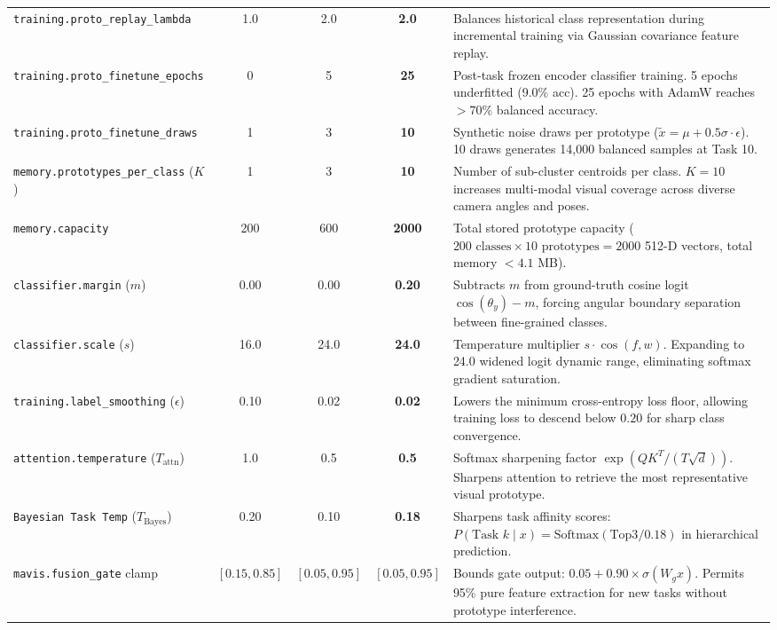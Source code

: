 \documentclass[11pt,a4paper]{article}
\begin{document}
\begin{table}[h!]
\begin{tabularx}{\textwidth}{p{3.2cm} c c c p{6.8cm}}
\texttt{training.proto\_replay\_lambda} & 1.0 & 2.0 & \textbf{2.0} & Balances historical class representation during incremental training via Gaussian covariance feature replay. \\
\texttt{training.proto\_finetune\_epochs} & 0 & 5 & \textbf{25} & Post-task frozen encoder classifier training. 5 epochs underfitted (9.0\% acc). 25 epochs with AdamW reaches $>70\%$ balanced accuracy. \\
\texttt{training.proto\_finetune\_draws} & 1 & 3 & \textbf{10} & Synthetic noise draws per prototype ($\tilde{x} = \mu + 0.5\sigma \cdot \epsilon$). 10 draws generates 14,000 balanced samples at Task 10. \\
\texttt{memory.prototypes\_per\_class} ($K$) & 1 & 3 & \textbf{10} & Number of sub-cluster centroids per class. $K=10$ increases multi-modal visual coverage across diverse camera angles and poses. \\
\texttt{memory.capacity} & 200 & 600 & \textbf{2000} & Total stored prototype capacity ($200 \text{ classes} \times 10 \text{ prototypes} = 2000$ 512-D vectors, total memory $<4.1$ MB). \\
\texttt{classifier.margin} ($m$) & 0.00 & 0.00 & \textbf{0.20} & Subtracts $m$ from ground-truth cosine logit $\cos(\theta_y) - m$, forcing angular boundary separation between fine-grained classes. \\
\texttt{classifier.scale} ($s$) & 16.0 & 24.0 & \textbf{24.0} & Temperature multiplier $s \cdot \cos(f, w)$. Expanding to 24.0 widened logit dynamic range, eliminating softmax gradient saturation. \\
\texttt{training.label\_smoothing} ($\epsilon$) & 0.10 & 0.02 & \textbf{0.02} & Lowers the minimum cross-entropy loss floor, allowing training loss to descend below $0.20$ for sharp class convergence. \\
\texttt{attention.temperature} ($T_{\text{attn}}$) & 1.0 & 0.5 & \textbf{0.5} & Softmax sharpening factor $\exp(QK^T / (T \sqrt{d}))$. Sharpens attention to retrieve the most representative visual prototype. \\
\texttt{Bayesian Task Temp} ($T_{\text{Bayes}}$) & 0.20 & 0.10 & \textbf{0.18} & Sharpens task affinity scores: $P(\text{Task } k \mid x) = \text{Softmax}(\text{Top3} / 0.18)$ in hierarchical prediction. \\
\texttt{mavis.fusion\_gate} clamp & $[0.15, 0.85]$ & $[0.05, 0.95]$ & \textbf{$[0.05, 0.95]$} & Bounds gate output: $0.05 + 0.90 \times \sigma(W_g x)$. Permits 95\% pure feature extraction for new tasks without prototype interference. \\
\bottomrule
\end{tabularx}
\end{table}
\end{document}

